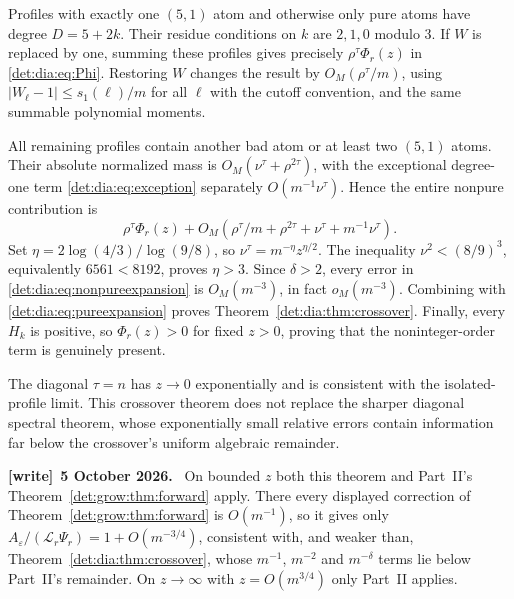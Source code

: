 \documentclass[11pt,letterpaper]{article}
\numberwithin{equation}{section}
\theoremstyle{definition}\newtheorem{definition}[theorem]{Definition}
\theoremstyle{remark}\newtheorem{remark}[theorem]{Remark}
\newcommand{\eps}{\varepsilon}
\newenvironment{writenote}[1][]{\par\smallskip\begingroup\small
 \noindent\textbf{[write]}\if\relax\detokenize{#1}\relax\else~\textbf{#1.}\fi\ }%
 {\par\endgroup\smallskip}
\begin{document}
Profiles with exactly one $(5,1)$ atom and otherwise only pure atoms
have degree $D=5+2k$. Their residue conditions on $k$ are $2,1,0$
modulo $3$. If $W$ is replaced by one, summing these profiles gives
precisely $\rho^\tau\Phi_r(z)$ in \eqref{det:dia:eq:Phi}.
Restoring $W$ changes the result by $O_M(\rho^\tau/m)$, using
$|W_\ell-1|\leq s_1(\ell)/m$ for all $\ell$ with the cutoff
convention, and the same summable polynomial moments.

All remaining profiles contain another bad atom or at least two
$(5,1)$ atoms. Their absolute normalized mass is
$O_M(\nu^\tau+\rho^{2\tau})$, with the exceptional degree-one
term \eqref{det:dia:eq:exception} separately $O(m^{-1}\nu^\tau)$.
Hence the entire nonpure contribution is
\begin{equation}\label{det:dia:eq:nonpureexpansion}
 \rho^\tau\Phi_r(z)+O_M\left(
 \rho^\tau/m+\rho^{2\tau}+\nu^\tau+m^{-1}\nu^\tau\right).
\end{equation}
Set $\eta=2\log(4/3)/\log(9/8)$, so
$\nu^\tau=m^{-\eta}z^{\eta/2}$.
The inequality $\nu^2<(8/9)^3$, equivalently $6561<8192$, proves
$\eta>3$. Since $\delta>2$, every error in
\eqref{det:dia:eq:nonpureexpansion} is $O_M(m^{-3})$, in fact
$o_M(m^{-3})$. Combining with \eqref{det:dia:eq:pureexpansion} proves
Theorem~\ref{det:dia:thm:crossover}. Finally, every $H_k$ is positive, so
$\Phi_r(z)>0$ for fixed $z>0$, proving that the noninteger-order term
is genuinely present.

The diagonal $\tau=n$ has $z\to0$ exponentially and is consistent
with the isolated-profile limit. This crossover theorem does not replace
the sharper diagonal spectral theorem, whose exponentially small
relative errors contain information far below the crossover's uniform
algebraic remainder.
\begin{writenote}[5 October 2026]
On bounded $z$ both this theorem and Part~II's Theorem~\ref{det:grow:thm:forward} apply. There every displayed correction of Theorem~\ref{det:grow:thm:forward} is $O(m^{-1})$, so it gives only $A_\eps/(\mathcal L_r\Psi_r)=1+O(m^{-3/4})$, consistent with, and weaker than, Theorem~\ref{det:dia:thm:crossover}, whose $m^{-1}$, $m^{-2}$ and $m^{-\delta}$ terms lie below Part~II's remainder. On $z\to\infty$ with $z=O(m^{3/4})$ only Part~II applies.
\end{writenote}
\end{document}
